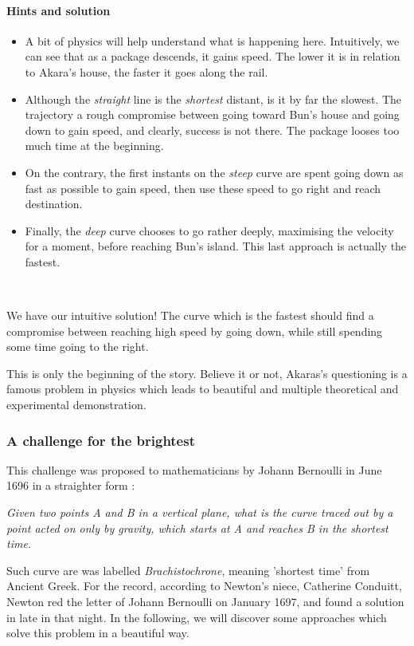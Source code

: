 \documentclass{article}
\begin{document}
\begin{tcolorbox}

\paragraph{Hints and solution}
\begin{itemize}
  \item A bit of physics will help understand what is happening here. Intuitively, we can see that as a package descends, it gains speed. The lower it is in relation to Akara's house, the faster it goes along the rail.
  \item Although the \textit{straight} line is the \textit{shortest} distant, is it by far the slowest. The trajectory a rough compromise between going toward Bun's house and going down to gain speed, and clearly, success is not there. The package looses too much time at the beginning.
  \item On the contrary, the first instants on the \textit{steep} curve are spent going down as fast as possible to gain speed, then use these speed to go right and reach destination.
  \item Finally, the \textit{deep} curve chooses to go rather deeply, maximising the velocity for a moment, before reaching Bun's island. This last approach is actually the fastest.
\end{itemize}
\end{tcolorbox}
~

We have our intuitive solution! The curve which is the fastest should find a compromise between reaching high speed by going down, while still spending some time going to the right.

This is only the beginning of the story. Believe it or not, Akaras's questioning is a famous problem in physics which leads to beautiful and multiple theoretical and experimental demonstration.

\subsubsection*{A challenge for the brightest}

This challenge was proposed to mathematicians by Johann Bernoulli in June 1696 in a straighter form :
\begin{center}
  \textit{Given two points A and B in a vertical plane, what is the curve traced out by a point acted on only by gravity, which starts at A and reaches B in the shortest time.}
\end{center}
Such curve are was labelled \textit{Brachistochrone}, meaning 'shortest time' from Ancient Greek. For the record, according to Newton's niece, Catherine Conduitt, Newton red the letter of Johann Bernoulli on January 1697, and found a solution in late in that night. In the following, we will discover some approaches which solve this problem in a beautiful way.
\end{document}
